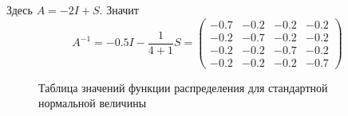 \documentclass[addpoints, answers]{exam} %
\begin{document}
\begin{questions}
\begin{parts}
\begin{solution}
Здесь $A=-2I+S$. Значит
\[
A^{-1}=-0.5I - \frac{1}{4+1}S =
\begin{pmatrix}
-0.7 & -0.2 & -0.2 & -0.2 \\
-0.2 & -0.7 & -0.2 & -0.2 \\
-0.2 & -0.2 & -0.7 & -0.2 \\
-0.2 & -0.2 & -0.2 & -0.7
\end{pmatrix}
\]
\end{solution}

\end{parts}



\end{questions}



\begin{figure}[b]
\caption{Таблица значений функции распределения для стандартной нормальной величины}
  \begin{minipage}[b]{0.35\linewidth}
    \centering
\end{minipage}
\end{figure}
\end{document}
